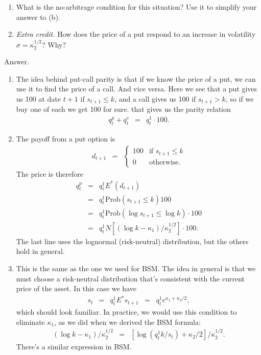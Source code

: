 \documentclass[11pt]{article}
\begin{document}
\begin{enumerate}
\begin{enumerate}
\item What is the no-arbitrage condition for this situation?
Use it to simplify your answer to (b).

\item {\it Extra credit.\/}
How does the price of a put respond to an increase in volatility
$ \sigma = \kappa_2^{1/2}$?
Why?
\end{enumerate}
%
Answer.
\begin{enumerate}
\item The idea behind put-call parity is that if we know the price of a put,
we can use it to find the price of a call.  And vice versa.
Here we see that a put gives us 100 at date $t+1$ if $s_{t+1} \leq k$,
and a call gives us 100 if $s_{t+1} > k$, so if we buy one of each we get
100 for sure.
that gives us the parity relation
\begin{eqnarray*}
    q^p_t + q^c_t &=& q^1_t \cdot 100 .
\end{eqnarray*}

\item The payoff from a put option is
\begin{eqnarray*}
    d_{t+1} &=&
        \left\{
        \begin{array}{rl}
            100    &  \mbox{if } s_{t+1} \leq k  \\
            0      &  \mbox{otherwise} .
        \end{array}
        \right.
\end{eqnarray*}
The price is therefore
\begin{eqnarray*}
    q^p_t &=& q^1_t E^* (d_{t+1})  \\
            &=& q^1_t \mbox{Prob}(s_{t+1}\leq k) 100 \\
            &=& q^1_t \mbox{Prob}(\log s_{t+1}\leq \log k) \cdot 100 \\
            &=& q^1_t N [ (\log k-\kappa_1)/\kappa_2^{1/2}] \cdot 100 .
\end{eqnarray*}
The last line uses the lognormal (risk-neutral) distribution, but
the others hold in general.

\item This is the same as the one we used for BSM.
The idea in general is that we must choose a risk-neutral distribution
that's consistent with the current price of the asset.
In this case we have
\begin{eqnarray*}
    s_t &=& q^1_t E^* s_{t+1} \;\;=\;\; q^1_t e^{\kappa_1 + \kappa_2/2} ,
\end{eqnarray*}
which should look familiar.
In practice, we would use this condition to eliminate $\kappa_1$,
as we did when we derived the BSM formula:
\begin{eqnarray*}
    (\log k - \kappa_1)/\kappa_2^{1/2} &=&
            [\log (q^1_t k/s_t) + \kappa_2/2]/\kappa_2^{1/2} .
\end{eqnarray*}
There's a similar expression in BSM.


\end{enumerate}
\end{enumerate}
\end{document}
